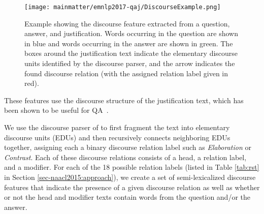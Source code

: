 \begin{figure}[t]
\begin{center}
\texttt{[image: mainmatter/emnlp2017-qaj/DiscourseExample.png]}
\caption{Example showing the discourse feature extracted from a question, answer, and justification.  Words occurring in the question are shown in blue and words occurring in the answer are shown in green.  The boxes around the justification text indicate the elementary discourse units identified by the discourse parser, and the arrow indicates the found discourse relation (with the assigned relation label given in red). }
\label{fig:discourseexample}
\vspace{-5mm}
\end{center}
\end{figure}

{}  These features use the discourse structure of the justification text, which has been shown to be useful for QA~\citep[][see also Chapter \ref{chapter:naacl2015}]{jansen14,sharp-EtAl:2015:NAACL-HLT, sachan2016science}. %

We use the discourse parser of \citet{Surdeanu:15} to first fragment the text into elementary discourse units (EDUs) and then recursively connects neighboring EDUs together, assigning each a binary discourse relation label such as \emph{Elaboration} or \emph{Contrast}. Each of these discourse relations consists of a head, a relation label, and a modifier. 
%
For each of the 18 possible relation labels (listed in Table \ref{tab:rst} in Section \ref{sec-naacl2015:approach}), we create 
a set of semi-lexicalized discourse features that indicate the presence of a given discourse relation as well as whether or not the head and modifier texts contain words from the question and/or the answer.  %

